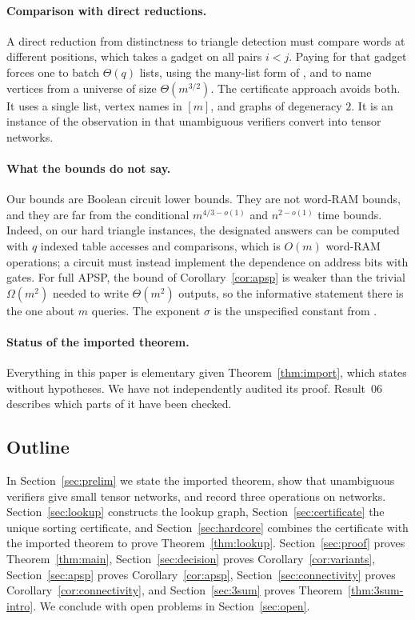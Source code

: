 \documentclass[11pt]{article}
\theoremstyle{definition}
\theoremstyle{remark}
\begin{document}
\paragraph{Comparison with direct reductions.} A direct reduction from
distinctness to triangle detection must compare words at different
positions, which takes a gadget on all pairs $i<j$. Paying for that gadget
forces one to batch $\Theta(q)$ lists, using the many-list form of
\cite[Theorem~2.2]{OAI}, and to name vertices from a universe of size
$\Theta(m^{3/2})$. The certificate approach avoids both. It uses a single
list, vertex names in $[m]$, and graphs of degeneracy $2$. It is an
instance of the observation in \cite[Section~7]{R06} that unambiguous
verifiers convert into tensor networks.

\paragraph{What the bounds do not say.} Our bounds are Boolean circuit
lower bounds. They are not word-RAM bounds, and they are far from the
conditional $m^{4/3-o(1)}$ and $n^{2-o(1)}$ time bounds. Indeed, on our
hard triangle instances, the designated answers can be computed with $q$
indexed table accesses and comparisons, which is $O(m)$ word-RAM
operations; a circuit must instead implement the dependence on address bits
with gates. For full APSP, the bound of Corollary~\ref{cor:apsp} is
weaker than the trivial $\Omega(m^2)$ needed to write $\Theta(m^2)$
outputs, so the informative statement there is the one about $m$ queries.
The exponent $\sigma$ is the unspecified constant from \cite{OAI}.

\paragraph{Status of the imported theorem.} Everything in this paper is
elementary given Theorem~\ref{thm:import}, which \cite{OAI} states without
hypotheses. We have not independently audited its proof. Result~06
\cite[Section~6]{R06} describes which parts of it have been checked.

\subsection{Outline}
In Section~\ref{sec:prelim} we state the imported theorem, show that
unambiguous verifiers give small tensor networks, and record three
operations on networks. Section~\ref{sec:lookup} constructs the lookup
graph, Section~\ref{sec:certificate} the unique sorting certificate, and
Section~\ref{sec:hardcore} combines the certificate with the imported
theorem to prove Theorem~\ref{thm:lookup}. Section~\ref{sec:proof} proves
Theorem~\ref{thm:main}, Section~\ref{sec:decision} proves
Corollary~\ref{cor:variants}, Section~\ref{sec:apsp} proves
Corollary~\ref{cor:apsp}, Section~\ref{sec:connectivity} proves
Corollary~\ref{cor:connectivity}, and Section~\ref{sec:3sum} proves
Theorem~\ref{thm:3sum-intro}. We conclude with open problems in
Section~\ref{sec:open}.
\end{document}
